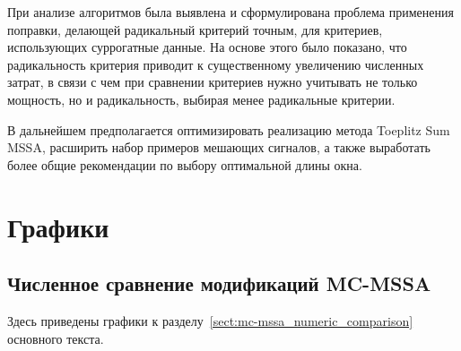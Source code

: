 \documentclass[specialist,
substylefile = spbu_report.rtx,
subf,href,colorlinks=true, 12pt]{disser}
\theoremstyle{definition}
\begin{document}
При анализе алгоритмов была выявлена и сформулирована проблема применения поправки, делающей радикальный критерий точным, для критериев, использующих суррогатные данные. На основе этого было показано, что радикальность критерия приводит к существенному увеличению численных затрат, в связи с чем при сравнении критериев нужно учитывать не только мощность, но и радикальность, выбирая менее радикальные критерии.

В дальнейшем предполагается оптимизировать реализацию метода Toeplitz Sum MSSA, расширить набор примеров мешающих сигналов, а также выработать более общие рекомендации по выбору оптимальной длины окна.




\appendix

\chapter{Графики}
\section{Численное сравнение модификаций MC-MSSA}\label{appendix:mc-mssa_graphs}
Здесь приведены графики к разделу~\ref{sect:mc-mssa_numeric_comparison} основного текста.
\end{document}
